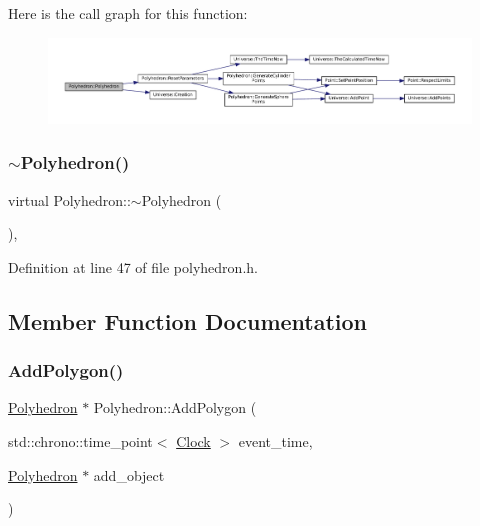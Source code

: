 Here is the call graph for this function\+:\nopagebreak
\begin{figure}[H]
\begin{center}
\leavevmode
\includegraphics[width=350pt]{class_polyhedron_af5bb1d2a6b04502dfdbfc9f04aafc950_cgraph}
\end{center}
\end{figure}
\mbox{\label{class_polyhedron_a3ad3df8be901a55ddcd97128ac890473}} 
\subsubsection{\texorpdfstring{$\sim$\+Polyhedron()}{~Polyhedron()}}
{\footnotesize\ttfamily virtual Polyhedron\+::$\sim$\+Polyhedron (\begin{DoxyParamCaption}{ }\end{DoxyParamCaption})\hspace{0.3cm}{\ttfamily [inline]}, {\ttfamily [virtual]}}



Definition at line 47 of file polyhedron.\+h.



\subsection{Member Function Documentation}
\mbox{\label{class_polyhedron_a63bc509a87935cc25e541d2490c01d1f}} 
\subsubsection{\texorpdfstring{Add\+Polygon()}{AddPolygon()}}
{\footnotesize\ttfamily \mbox{\hyperlink{class_polyhedron}{Polyhedron}} $\ast$ Polyhedron\+::\+Add\+Polygon (\begin{DoxyParamCaption}\item[{std\+::chrono\+::time\+\_\+point$<$ \mbox{\hyperlink{universe_8h_a0ef8d951d1ca5ab3cfaf7ab4c7a6fd80}{Clock}} $>$}]{event\+\_\+time,  }\item[{\mbox{\hyperlink{class_polyhedron}{Polyhedron}} $\ast$}]{add\+\_\+object }\end{DoxyParamCaption})}



